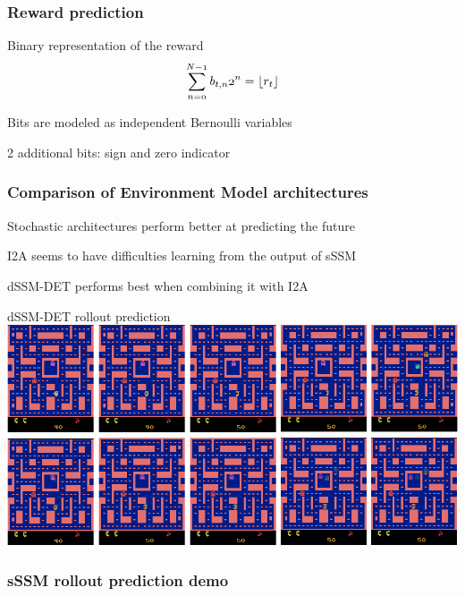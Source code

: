 \begin{frame}
	\frametitle{Reward prediction}
	\begin{PraesentationAufzaehlung}
		\item Binary representation of the reward
		\begin{equation}
			\mathnormal{
			\sum_{n=0}^{N-1}b_{t,n}2^n = \lfloor r_t \rfloor
			}
		\end{equation}
		\item Bits are modeled as independent Bernoulli variables
		\item 2 additional bits: sign and zero indicator
	\end{PraesentationAufzaehlung}
\end{frame}


\begin{frame}
	\frametitle{Comparison of Environment Model architectures}
	\begin{PraesentationAufzaehlung}
		\item Stochastic architectures perform better at predicting the future\\
		\item I2A seems to have difficulties learning from the output of sSSM
		\item dSSM-DET performs best when combining it with I2A
	\end{PraesentationAufzaehlung}
\end{frame}




\begin{frame}{dSSM-DET rollout prediction}
    \includegraphics[width=\textwidth]{./latent_i2a_images/dSSM_rollout_prediction.png}
\end{frame}

\begin{frame}
	\frametitle{sSSM rollout prediction demo}
\end{frame}


